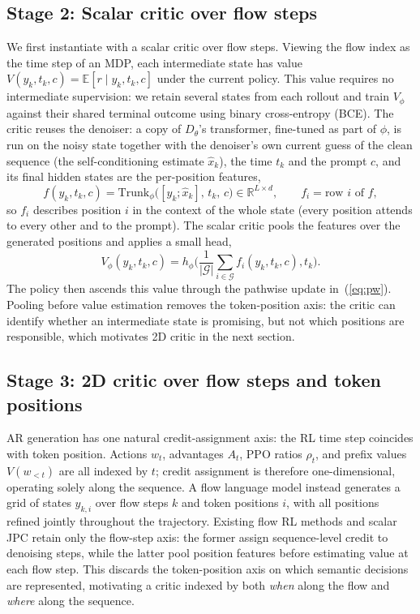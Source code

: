 \subsection{Stage 2: Scalar critic over flow steps}
\label{sec:jpc_scalar}
We first instantiate \jpc{} with a scalar critic over flow steps. Viewing the flow index as the time step of an MDP, each intermediate state has value $V(y_k,t_k,c)=\mathbb E[r\mid y_k,t_k,c]$ under the current policy. This value requires no intermediate supervision: we retain several states from each rollout and train $V_\phi$ against their shared terminal outcome using binary cross-entropy (BCE). The critic reuses the denoiser: a copy of $D_\theta$'s transformer, fine-tuned as part of $\phi$, is run on the noisy state together with the denoiser's own current guess of the clean sequence (the self-conditioning estimate $\hat x_k$), the time $t_k$ and the prompt $c$, and its final hidden states are the per-position features,
\begin{equation}
f(y_k,t_k,c)=\mathrm{Trunk}_\phi\big([y_k;\hat x_k],\,t_k,\,c\big)\in\mathbb R^{L\times d},\qquad f_i=\text{row }i\text{ of }f,
\label{eq:feat}
\end{equation}
so $f_i$ describes position $i$ in the context of the whole state (every position attends to every other and to the prompt). The scalar critic pools the features over the generated positions and applies a small head,
\[
V_\phi(y_k,t_k,c)=h_\phi\bigl(\frac{1}{|\mathcal G|}\sum_{i\in\mathcal G}f_i(y_k,t_k,c),t_k\bigr).
\]
The policy then ascends this value through the pathwise update in~(\ref{eq:pw}). Pooling before value estimation removes the token-position axis: the critic can identify whether an intermediate state is promising, but not which positions are responsible, which motivates 2D critic in the next section.

\subsection{Stage 3: 2D critic over flow steps and token positions}
\label{sec:jpc_2d}

AR generation has one natural credit-assignment axis: the RL time step coincides with token position. Actions $w_t$, advantages $A_t$, PPO ratios $\rho_t$, and prefix values $V(w_{<t})$ are all indexed by $t$; credit assignment is therefore one-dimensional, operating solely along the sequence. A flow language model instead generates a grid of states $y_{k,i}$ over flow steps $k$ and token positions $i$, with all positions refined jointly throughout the trajectory. Existing flow RL methods \citep{liu2025flowgrpo, xue2025dancegrpo} and scalar JPC retain only the flow-step axis: the former assign sequence-level credit to denoising steps, while the latter pool position features before estimating value at each flow step. This discards the token-position axis on which semantic decisions are represented, motivating a critic indexed by both \emph{when} along the flow and \emph{where} along the sequence.

